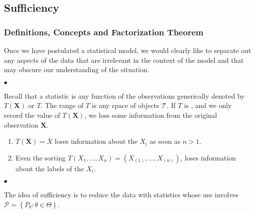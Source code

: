 \documentclass{article}
\begin{document}
\subsection{Sufficiency}
\subsubsection{Definitions, Concepts and Factorization Theorem}
Once we have postulated a statistical model, we would clearly like to separate out any aspects of the data that are irrelevant in the context of the model and that may obscure our understanding of the situation.

$\bullet$ 

Recall that a statistic is any function of the observations generically denoted by $T(\mathbf{X})$ or $T$. The range of $T$ is any space of objects $\mathcal{T}$. If $T$ is , and we only record the value of $T(\mathbf{X})$, we loss some information from the original observation $\mathbf{X}$.

\begin{exma}
\begin{enumerate} We give two statistics here for illustration:
    \item $T(\mathbf{X})=\bar{X}$ loses information about the $X_{i}$ as soon as $n>1$.
    \item  Even the sorting $T\left(X_{1}, \ldots, X_{n}\right)=\left(X_{(1)}, \ldots, X_{(n)}\right)$, loses information about the labels of the $X_{i}$.
\end{enumerate}
\end{exma}

$\bullet$ 

The idea of sufficiency is to reduce the data with statistics whose use involves  $\mathcal{P}=\left\{P_{\theta}: \theta \in \Theta\right\}$.
\end{document}
